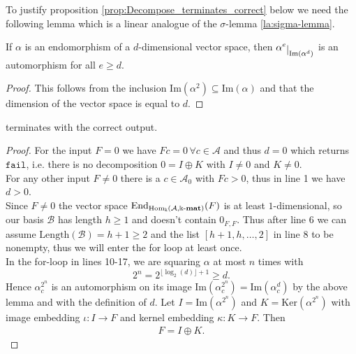 To justify proposition \ref{prop:Decompose_terminates_correct} below we need the following lemma which is a linear analogue of the
$\sigma$-lemma \ref{la:sigma-lemma}.

\begin{lemma}
If $\alpha$ is an endomorphism of a $d$-dimensional vector space, then $\alpha^{e}\restrict{\mathrm{Im}(\alpha^{d})}$ is an automorphism for
all $e \geq d$.
\end{lemma}
\begin{proof}
This follows from the inclusion $\mathrm{Im}(\alpha^{2}) \subseteq \mathrm{Im}(\alpha)$ and that the dimension of the vector space is equal to
$d$.
\end{proof}

\begin{proposition}\label{prop:Decompose_terminates_correct}
 terminates with the correct output.
\end{proposition}
\begin{proof}
For the input $F = 0$ we have $Fc = 0\,\forall c \in \mathcal{A}$ and thus $d = 0$ which returns $\mathtt{fail}$, i.e. there is no
decomposition $0 = I \oplus K$ with $I \neq 0$ and $K \neq 0$.\\

\noindent For any other input $F \neq 0$ there is a $c \in \mathcal{A}_{0}$ with $Fc > 0$, thus in line 1 we have $d > 0$.\\
Since $F \neq 0$ the vector space $\mathrm{End}_{\mathrm{Hom_{\Bbbk}}(\mathcal{A},\Bbbk\textnormal{-}\mathbf{mat})}(F)$ is at least $1$-dimensional, so our basis $\mathcal{B}$ has
length $h \geq 1$ and doesn't contain $0_{F,F}$. Thus after line 6 we can assume $\mathrm{Length}(\mathcal{B}) = h+1 \geq 2$ and
the list $[h+1,h,\dots,2]$ in line 8 to be nonempty, thus we will enter the for loop at least once.\\

\noindent In the for-loop in lines 10-17, we are squaring $\alpha$ at most $n$ times with
\[
2^{n} = 2^{\lfloor\log_{2}(d)\rfloor+1} \geq d.
\]
Hence $\alpha_{c}^{2^{n}}$ is an automorphism on its image $\mathrm{Im}(\alpha_{c}^{2^{n}}) = \mathrm{Im}(\alpha_{c}^{d})$
by the above lemma and with the definition of $d$. Let $I = \mathrm{Im}(\alpha^{2^{n}})$ and $K = \mathrm{Ker}(\alpha^{2^{n}})$
with image embedding $\iota : I \rightarrow F$ and kernel embedding $\kappa : K \rightarrow F$. Then 
\begin{align}
F = I \oplus K.
\end{align}
\end{proof}


